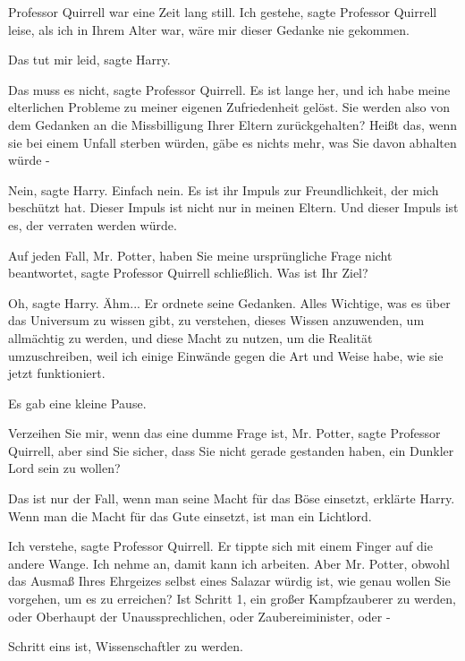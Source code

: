 Professor Quirrell war eine Zeit lang still. \glqq{}Ich gestehe\grqq{}, sagte
Professor Quirrell leise, \glqq{}als ich in Ihrem Alter war, wäre mir dieser
Gedanke nie gekommen.\grqq{}

\glqq{}Das tut mir leid\grqq{}, sagte Harry.

\glqq{}Das muss es nicht\grqq{}, sagte Professor Quirrell. \glqq{}Es ist lange
her, und ich habe meine elterlichen Probleme zu meiner eigenen Zufriedenheit
gelöst. Sie werden also von dem Gedanken an die Missbilligung Ihrer Eltern
zurückgehalten? Heißt das, wenn sie bei einem Unfall sterben würden, gäbe es
nichts mehr, was Sie davon abhalten würde -\grqq{}

\glqq{}Nein\grqq{}, sagte Harry. \glqq{}Einfach nein. Es ist ihr Impuls zur
Freundlichkeit, der mich beschützt hat. Dieser Impuls ist nicht nur in meinen
Eltern. Und dieser Impuls ist es, der verraten werden würde.\grqq{}

\glqq{}Auf jeden Fall, Mr. Potter, haben Sie meine ursprüngliche Frage nicht
beantwortet\grqq{}, sagte Professor Quirrell schließlich. \glqq{}Was ist Ihr
Ziel?\grqq{}

\glqq{}Oh\grqq{}, sagte Harry. \glqq{}Ähm...\grqq{} Er ordnete seine Gedanken.
\glqq{}Alles Wichtige, was es über das Universum zu wissen gibt, zu verstehen,
dieses Wissen anzuwenden, um allmächtig zu werden, und diese Macht zu nutzen, um
die Realität umzuschreiben, weil ich einige Einwände gegen die Art und Weise
habe, wie sie jetzt funktioniert.\grqq{}

Es gab eine kleine Pause.

\glqq{}Verzeihen Sie mir, wenn das eine dumme Frage ist, Mr. Potter\grqq{}, sagte
Professor Quirrell, \glqq{}aber sind Sie sicher, dass Sie nicht gerade gestanden
haben, ein Dunkler Lord sein zu wollen?\grqq{}

\glqq{}Das ist nur der Fall, wenn man seine Macht für das Böse einsetzt\grqq{},
erklärte Harry. \glqq{}Wenn man die Macht für das Gute einsetzt, ist man ein
Lichtlord.\grqq{}

\glqq{}Ich verstehe\grqq{}, sagte Professor Quirrell. Er tippte sich mit einem
Finger auf die andere Wange. \glqq{}Ich nehme an, damit kann ich arbeiten. Aber
Mr. Potter, obwohl das Ausmaß Ihres Ehrgeizes selbst eines Salazar würdig ist,
wie genau wollen Sie vorgehen, um es zu erreichen? Ist Schritt 1, ein großer
Kampfzauberer zu werden, oder Oberhaupt der Unaussprechlichen, oder
Zaubereiminister, oder -\grqq{}

\glqq{}Schritt eins ist, Wissenschaftler zu werden.\grqq{}

